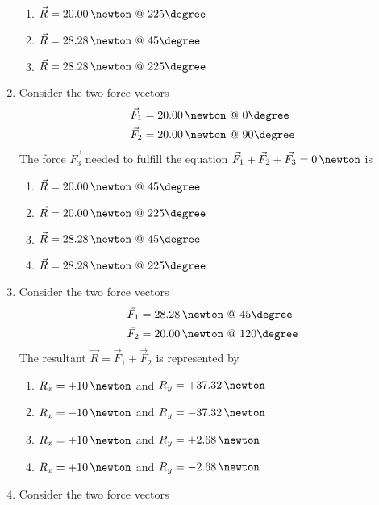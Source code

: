 \begin{enumerate}
\begin{enumerate}
  \item $\vec{R} = 20.00\,\newton \ @ \ 225\degree$
  \item $\vec{R} = 28.28\,\newton \ @ \ 45\degree$
  \item $\vec{R} = 28.28\,\newton \ @ \ 225\degree$
  \end{enumerate}
\item Consider the two force vectors
  \begin{equation*}
    \begin{aligned} %
      \vec{F}_1 & = 20.00\,\newton \ @ \ 0\degree \\
      \vec{F}_2 & = 20.00\,\newton \ @ \ 90\degree
    \end{aligned}
  \end{equation*}
  The force $\vec{F_{3}}$ needed to fulfill the equation $\vec{F}_1 + \vec{F}_2 + \vec{F_{3}} = 0\,\newton$ is
  \begin{enumerate}
  \item $\vec{R} = 20.00\,\newton \ @ \ 45\degree$
  \item $\vec{R} = 20.00\,\newton \ @ \ 225\degree$
  \item $\vec{R} = 28.28\,\newton \ @ \ 45\degree$
  \item $\vec{R} = 28.28\,\newton \ @ \ 225\degree$
  \end{enumerate}
\item Consider the two force vectors
  \begin{equation*}
    \begin{aligned} %
      \vec{F}_1 & = 28.28\,\newton \ @ \ 45\degree \\
      \vec{F}_2 & = 20.00\,\newton\ @ \ 120\degree
    \end{aligned}
  \end{equation*}
  The resultant $\vec{R} = \vec{F}_1 + \vec{F}_2$ is represented by
  \begin{enumerate}
  \item $R_{x} = +10\,\newton$ and $R_{y} = +37.32\,\newton$
  \item $R_{x} = -10\,\newton$ and $R_{y} = -37.32\,\newton$
  \item $R_{x} = +10\,\newton$ and $R_{y} = +2.68\,\newton$
  \item $R_{x} = +10\,\newton$ and $R_{y} = -2.68\,\newton$
  \end{enumerate}
\item Consider the two force vectors
  \begin{equation*}
    \begin{aligned} %

\end{aligned}
\end{equation*}
\end{enumerate}

